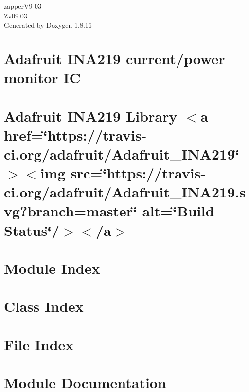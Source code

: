 \let\mypdfximage\pdfximage\def\pdfximage{\immediate\mypdfximage}\documentclass[twoside]{book}
\newcommand{\+}{\discretionary{\mbox{\scriptsize$\hookleftarrow$}}{}{}}
\newcommand{\clearemptydoublepage}{%
  \newpage{\pagestyle{empty}\cleardoublepage}%
}
\begin{document}
\hypersetup{pageanchor=false,
             bookmarksnumbered=true,
             pdfencoding=unicode
            }
\begin{titlepage}
\vspace*{7cm}
\begin{center}%
{\Large zapper\+V9-\/03 \\[1ex]\large Zv09.\+03 }\\
\vspace*{1cm}
{\large Generated by Doxygen 1.8.16}\\
\end{center}
\end{titlepage}
\clearemptydoublepage
{}
\tableofcontents
\clearemptydoublepage
{}
\hypersetup{pageanchor=true}

\chapter{Adafruit I\+N\+A219 current/power monitor IC}
\label{index}\hypertarget{index}{}
\chapter{Adafruit I\+N\+A219 Library $<$a href=\char`\"{}https\+://travis-\/ci.\+org/adafruit/\+Adafruit\+\_\+\+I\+N\+A219\char`\"{}$>$$<$img src=\char`\"{}https\+://travis-\/ci.\+org/adafruit/\+Adafruit\+\_\+\+I\+N\+A219.\+svg?branch=master\char`\"{} alt=\char`\"{}\+Build Status\char`\"{}/$>$$<$/a$>$}
\label{md__c_1__users_mario__documents__arduino__e_s_p32_zapper_v9_80_arquivos-dox__adafruit__i_n_a219__r_e_a_d_m_e}

\chapter{Module Index}

\chapter{Class Index}

\chapter{File Index}

\chapter{Module Documentation}




\end{document}
